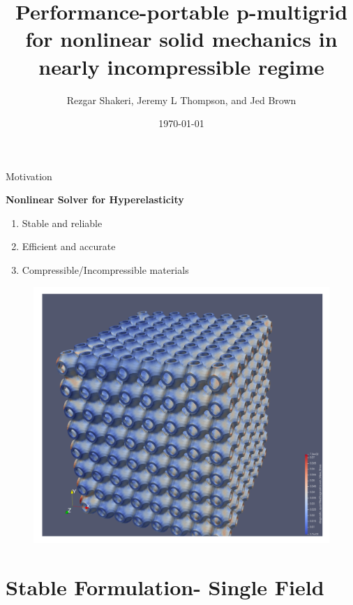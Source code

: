 \documentclass[aspectratio=169,xcolor=dvipsnames]{beamer}
\title[Portable Nonlinear Solid Mechanics Solver]{Performance-portable p-multigrid for nonlinear solid mechanics in nearly incompressible regime} %
\author[Surname]{Rezgar Shakeri, Jeremy L Thompson, and Jed Brown}
\date{\today} %
\begin{document}
\begin{frame}[plain]
    \titlepage
\end{frame}


\begin{frame}{Motivation}

\begin{minipage}{0.45\textwidth}
\textbf{Nonlinear Solver for Hyperelasticity}
{\large
    \begin{enumerate}
        \item Stable and reliable
        \item Efficient and accurate
        \item Compressible/Incompressible materials
    \end{enumerate}
}
\end{minipage}%
\begin{minipage}{0.55\textwidth}
        \begin{figure}
            \includegraphics[width=0.85\linewidth]{figures/schwarz-mesh.png}
        \end{figure}
\end{minipage}

\end{frame}

\section{Stable Formulation- Single Field}
\end{document}
